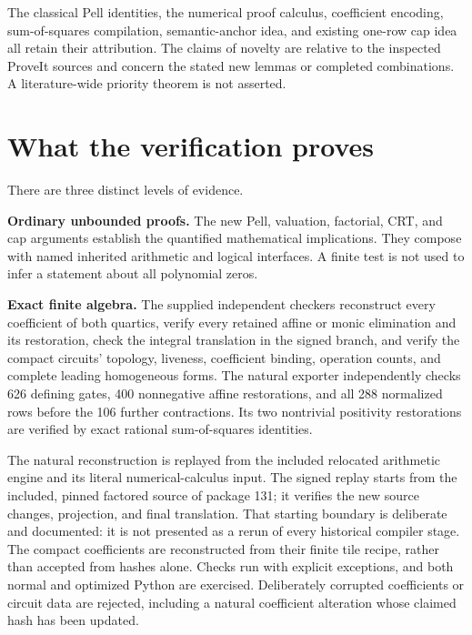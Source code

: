 \documentclass[11pt,a4paper]{article}
\theoremstyle{remark}\newtheorem{remark}[theorem]{Remark}
\begin{document}
The classical Pell identities, the numerical proof calculus, coefficient
encoding, sum-of-squares compilation, semantic-anchor idea, and existing
one-row cap idea all retain their attribution. The claims of novelty
are relative to the inspected ProveIt sources and concern the stated
new lemmas or completed combinations. A literature-wide priority theorem
is not asserted.






\section{What the verification proves}\label{sec:verification}

There are three distinct levels of evidence.

\textbf{Ordinary unbounded proofs.}
The new Pell, valuation, factorial, CRT, and cap arguments establish
the quantified mathematical implications. They compose with named
inherited arithmetic and logical interfaces. A finite test is not used
to infer a statement about all polynomial zeros.

\textbf{Exact finite algebra.}
The supplied independent checkers reconstruct every coefficient of
both quartics, verify every retained affine or monic elimination and
its restoration, check the integral translation in the signed branch,
and verify the compact circuits' topology, liveness, coefficient
binding, operation counts, and complete leading homogeneous forms.
The natural exporter independently checks 626 defining gates,
400 nonnegative affine restorations, and all 288 normalized rows before
the 106 further contractions. Its two nontrivial positivity restorations
are verified by exact rational sum-of-squares identities.

The natural reconstruction is replayed from the included relocated
arithmetic engine and its literal numerical-calculus input. The signed
replay starts from the included, pinned factored source of package 131;
it verifies the new source changes, projection, and final translation.
That starting boundary is deliberate and documented: it is not presented
as a rerun of every historical compiler stage. The compact coefficients
are reconstructed from their finite tile recipe, rather than accepted
from hashes alone. Checks run with explicit exceptions, and both normal
and optimized Python are exercised. Deliberately corrupted coefficients
or circuit data are rejected, including a natural coefficient alteration
whose claimed hash has been updated.
\end{document}
